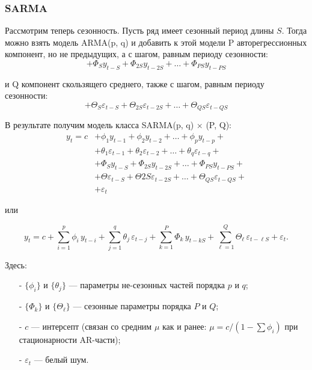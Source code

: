 
\subsubsection{SARMA}

Рассмотрим теперь сезонность. Пусть ряд имеет сезонный период длины $S$. Тогда можно взять модель 
ARMA(p, q) и добавить к этой модели P авторегрессионных компонент, но не предыдущих, а с шагом, равным периоду 
сезонности: 
\begin{equation*}
    + \Phi_S y_{t-S} + \Phi_{2S} y_{t-2S} + \dots + \Phi_{PS} y_{t-PS}
\end{equation*}

и Q компонент скользящего среднего, также с шагом, равным периоду сезонности:
\begin{equation*}
    + \Theta_S \varepsilon_{t-S} + \Theta_{2S} \varepsilon_{t-2S} + \dots + \Theta_{QS} \varepsilon_{t-QS}
\end{equation*}

В результате получим модель класса SARMA(p, q) $\times$ (P, Q):
\begin{align*}
    y_t = c &+ \phi_1 y_{t-1} + \phi_2 y_{t-2} + \dots + \phi_p y_{t-p} + \\
    &+ \theta_1 \varepsilon_{t-1} + \theta_2 \varepsilon_{t-2} + \dots + \theta_q \varepsilon_{t-q} + \\
    &+ \Phi_S y_{t-S} + \Phi_{2S} y_{t-2S} + \dots + \Phi_{PS} y_{t-PS} + \\
    &+ \Theta \varepsilon_{t-S} + \Theta{2S} \varepsilon_{t-2S} + \dots + \Theta_{QS} \varepsilon_{t-QS} +\\
    &+ \varepsilon_t 
\end{align*}

\begin{flushleft}
    или
\end{flushleft}
\vspace{-5pt}
\begin{equation*}
    y_t = c
    + \sum_{i=1}^p \phi_i\,y_{t-i}
    + \sum_{j=1}^q \theta_j\,\varepsilon_{t-j}
    + \sum_{k=1}^P \Phi_k\,y_{t-kS}
    + \sum_{\ell=1}^Q \Theta_\ell\,\varepsilon_{t-\ell S}
    + \varepsilon_t.
\end{equation*}

Здесь:
\begin{itemize}
    \item[-] \(\{\phi_i\}\) и \(\{\theta_j\}\) — параметры не-сезонных частей порядка \(p\) и \(q\);  
    \item[-] \(\{\Phi_k\}\) и \(\{\Theta_\ell\}\) — сезонные параметры порядка \(P\) и \(Q\);  
    \item[-] \(c\) — интерсепт (связан со средним \(\mu\) как и ранее: \(\mu = c/(1-\sum\phi_i)\) 
    при стационарности AR-части);  
    \item[-] \(\varepsilon_t\) — белый шум.  
\end{itemize}

